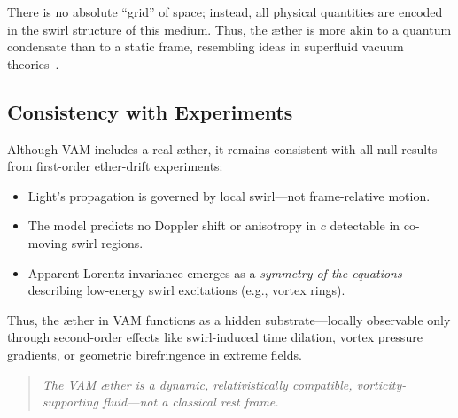 There is no absolute “grid” of space; instead, all physical quantities are encoded in the swirl structure of this medium. Thus, the æther is more akin to a quantum condensate than to a static frame, resembling ideas in superfluid vacuum theories~\cite{volovik2003}.

\subsection{Consistency with Experiments}

Although VAM includes a real æther, it remains consistent with all null results from first-order ether-drift experiments:

\begin{itemize}
    \item Light’s propagation is governed by local swirl—not frame-relative motion.
    \item The model predicts no Doppler shift or anisotropy in $c$ detectable in co-moving swirl regions.
    \item Apparent Lorentz invariance emerges as a \emph{symmetry of the equations} describing low-energy swirl excitations (e.g., vortex rings).
\end{itemize}

Thus, the æther in VAM functions as a hidden substrate—locally observable only through second-order effects like swirl-induced time dilation, vortex pressure gradients, or geometric birefringence in extreme fields.

\begin{quote}
        \emph{The VAM æther is a dynamic, relativistically compatible, vorticity-supporting fluid---not a classical rest frame.}
\end{quote}